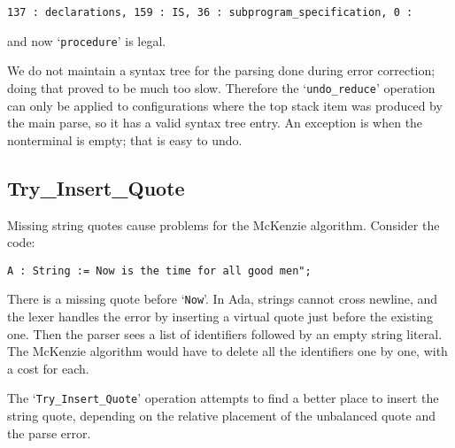 \documentclass{article}
\newcommand{\code}[1]{`{\tt #1}'}
\begin{document}
\begin{verbatim}
137 : declarations, 159 : IS, 36 : subprogram_specification, 0 :
\end{verbatim}
and now \code{procedure} is legal.

We do not maintain a syntax tree for the parsing done during error
correction; doing that proved to be much too slow. Therefore the
\code{undo\_reduce} operation can only be applied to configurations
where the top stack item was produced by the main parse, so it has a
valid syntax tree entry. An exception is when the nonterminal is
empty; that is easy to undo.

\subsection{Try\_Insert\_Quote}
Missing string quotes cause problems for the McKenzie algorithm.
Consider the code:
\begin{verbatim}
A : String := Now is the time for all good men";
\end{verbatim}
There is a missing quote before \code{Now}. In Ada, strings cannot
cross newline, and the lexer handles the error by inserting a virtual
quote just before the existing one. Then the parser sees a list of
identifiers followed by an empty string literal. The McKenzie
algorithm would have to delete all the identifiers one by one, with a
cost for each.

The \code{Try\_Insert\_Quote} operation attempts to find a better
place to insert the string quote, depending on the relative placement
of the unbalanced quote and the parse error.
\end{document}
